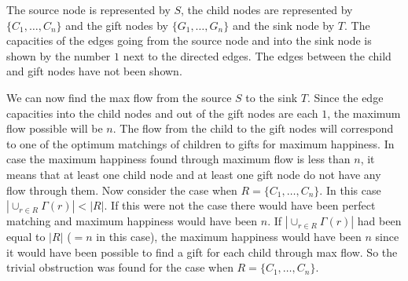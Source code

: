 \documentclass[addpoints]{exam}
\begin{document}
\begin{questions}
\begin{parts}
\end{parts}

The source node is represented by $S$, the child nodes are represented by $\{C_1,\ldots,C_n\}$ and the gift nodes by $\{G_1,\ldots,G_n\}$ and the sink node by $T$. The capacities of the edges going from the source node and into the sink node is shown by the number $1$ next to the directed edges. The edges between the child and gift nodes have not been shown.

We can now find the max flow from the source $S$ to the sink $T$. Since the edge capacities into the child nodes and out of the gift nodes are each $1$, the maximum flow possible will be $n$. The flow from the child to the gift nodes will correspond to one of the optimum matchings of children to gifts for maximum happiness. In case the maximum happiness found through maximum flow is less than $n$, it means that at least one child node and at least one gift node do not have any flow through them. Now consider the case when $R=\{C_1,\ldots,C_n\}$. In this case $|\cup_{r \in R} \Gamma(r)| < |R|$. If this were not the case there would have been perfect matching and maximum happiness would have been $n$. If $|\cup_{r \in R} \Gamma(r)|$ had been equal to $|R|$ ($=n$ in this case), the maximum happiness would have been $n$ since it would have been possible to find a gift for each child through max flow. So the trivial obstruction was found for the case when $R=\{C_1,\ldots,C_n\}$.


\end{questions}
\end{document}
